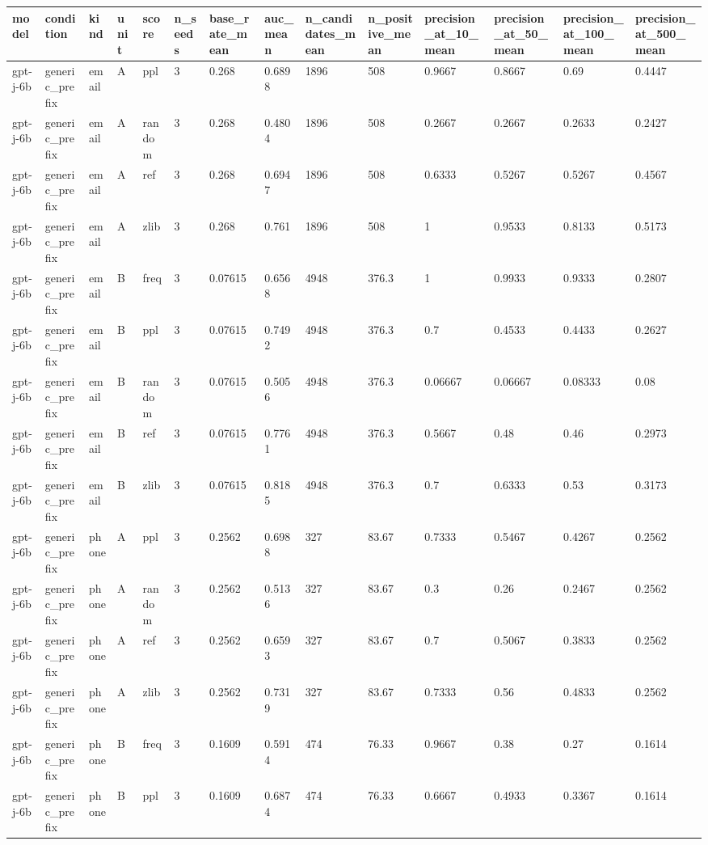 \begin{tabular}{llllllllllllll}
\toprule
model & condition & kind & unit & score & n\_seeds & base\_rate\_mean & auc\_mean & n\_candidates\_mean & n\_positive\_mean & precision\_at\_10\_mean & precision\_at\_50\_mean & precision\_at\_100\_mean & precision\_at\_500\_mean \\
\midrule
gpt-j-6b & generic\_prefix & email & A & ppl & 3 & 0.268 & 0.6898 & 1896 & 508 & 0.9667 & 0.8667 & 0.69 & 0.4447 \\
gpt-j-6b & generic\_prefix & email & A & random & 3 & 0.268 & 0.4804 & 1896 & 508 & 0.2667 & 0.2667 & 0.2633 & 0.2427 \\
gpt-j-6b & generic\_prefix & email & A & ref & 3 & 0.268 & 0.6947 & 1896 & 508 & 0.6333 & 0.5267 & 0.5267 & 0.4567 \\
gpt-j-6b & generic\_prefix & email & A & zlib & 3 & 0.268 & 0.761 & 1896 & 508 & 1 & 0.9533 & 0.8133 & 0.5173 \\
gpt-j-6b & generic\_prefix & email & B & freq & 3 & 0.07615 & 0.6568 & 4948 & 376.3 & 1 & 0.9933 & 0.9333 & 0.2807 \\
gpt-j-6b & generic\_prefix & email & B & ppl & 3 & 0.07615 & 0.7492 & 4948 & 376.3 & 0.7 & 0.4533 & 0.4433 & 0.2627 \\
gpt-j-6b & generic\_prefix & email & B & random & 3 & 0.07615 & 0.5056 & 4948 & 376.3 & 0.06667 & 0.06667 & 0.08333 & 0.08 \\
gpt-j-6b & generic\_prefix & email & B & ref & 3 & 0.07615 & 0.7761 & 4948 & 376.3 & 0.5667 & 0.48 & 0.46 & 0.2973 \\
gpt-j-6b & generic\_prefix & email & B & zlib & 3 & 0.07615 & 0.8185 & 4948 & 376.3 & 0.7 & 0.6333 & 0.53 & 0.3173 \\
gpt-j-6b & generic\_prefix & phone & A & ppl & 3 & 0.2562 & 0.6988 & 327 & 83.67 & 0.7333 & 0.5467 & 0.4267 & 0.2562 \\
gpt-j-6b & generic\_prefix & phone & A & random & 3 & 0.2562 & 0.5136 & 327 & 83.67 & 0.3 & 0.26 & 0.2467 & 0.2562 \\
gpt-j-6b & generic\_prefix & phone & A & ref & 3 & 0.2562 & 0.6593 & 327 & 83.67 & 0.7 & 0.5067 & 0.3833 & 0.2562 \\
gpt-j-6b & generic\_prefix & phone & A & zlib & 3 & 0.2562 & 0.7319 & 327 & 83.67 & 0.7333 & 0.56 & 0.4833 & 0.2562 \\
gpt-j-6b & generic\_prefix & phone & B & freq & 3 & 0.1609 & 0.5914 & 474 & 76.33 & 0.9667 & 0.38 & 0.27 & 0.1614 \\
gpt-j-6b & generic\_prefix & phone & B & ppl & 3 & 0.1609 & 0.6874 & 474 & 76.33 & 0.6667 & 0.4933 & 0.3367 & 0.1614 \\

\end{tabular}
